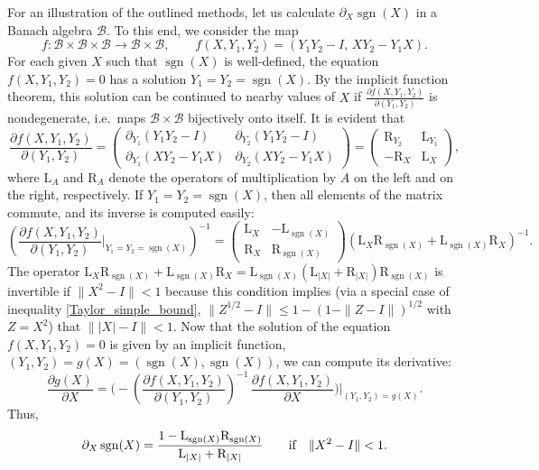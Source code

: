 \documentclass[12pt]{article}
\newcommand{\calB}{\mathcal{B}}
\DeclareMathOperator{\sgn}{sgn}
\newcommand{\La}{\mathrm{L}}
\newcommand{\Ra}{\mathrm{R}}
\renewcommand{\le}{\leqslant}
\newtheorem[definition]{Definition}[Theorem]{Definition}
\newtheorem[remark]{Example}[Theorem]{Example}
\newtheorem[remark]{Remark}[Theorem]{Remark}
\newtheorem[remark]{Question}[Theorem]{Open question}
\newtheorem*[definition]{definition}{Definition}
\newtheorem*[remark]{example}{Example}
\newtheorem*[remark]{remark}{Remark}
\newtheorem*[remark]{question}{Open question}
\numberwithin{equation}{section}
\begin{document}
For an illustration of the outlined methods, let us calculate $\partial_X\sgn(X)$ in a Banach algebra $\calB$. To this end, we consider the map
\begin{equation}
f\colon \calB\times\calB\times\calB\to\calB\times\calB,\qquad
f(X,Y_1,Y_2)=(Y_1Y_2-I,\,XY_2-Y_1X).
\end{equation}
For each given $X$ such that $\sgn(X)$ is well-defined, the equation $f(X,Y_1,Y_2)=0$ has a solution $Y_1=Y_2=\sgn(X)$. By the implicit function theorem, this solution can be continued to nearby values of $X$ if $\frac{\partial f(X,Y_1,Y_2)}{\partial(Y_1,Y_2)}$ is nondegenerate, i.e.\ maps $\calB\times\calB$ bijectively onto itself. It is evident that
\[
\frac{\partial f(X,Y_1,Y_2)}{\partial(Y_1,Y_2)}
=\begin{pmatrix}
\partial_{Y_1}(Y_1Y_2-I) & \partial_{Y_2}(Y_1Y_2-I)\\
\partial_{Y_1}(XY_2-Y_1X) & \partial_{Y_2}(XY_2-Y_1X)
\end{pmatrix}
=\begin{pmatrix}\Ra_{Y_2}&\La_{Y_1}\\ -\Ra_{X}&\La_{X}\end{pmatrix},
\]
where $\La_{A}$ and $\Ra_{A}$ denote the operators of multiplication by $A$ on the left and on the right, respectively. If $Y_1=Y_2=\sgn(X)$, then all elements of the matrix commute, and its inverse is computed easily:
\[
\left(\frac{\partial f(X,Y_1,Y_2)}{\partial(Y_1,Y_2)}
\bigg|_{Y_1=Y_2=\sgn(X)}\right)^{-1}
=\begin{pmatrix}\La_{X}&-\La_{\sgn(X)}\\ \Ra_{X}&\Ra_{\sgn(X)}\end{pmatrix}
(\La_X\Ra_{\sgn(X)}+\La_{\sgn(X)}\Ra_{X})^{-1}.
\]
The operator  $\La_X\Ra_{\sgn(X)}+\La_{\sgn(X)}\Ra_{X} =\La_{\sgn(X)}(\La_{|X|}+\Ra_{|X|})\Ra_{\sgn(X)}$ is invertible if $\|X^2-I\|<1$ because this condition implies (via a special case of inequality \eqref{Taylor_simple_bound}, $\|Z^{1/2}-I\|\le 1-(1-\|Z-I\|)^{1/2}$ with $Z=X^2$) that $\bigl\||X|-I\bigr\|<1$. Now that the solution of the equation $f(X,Y_1,Y_2)=0$ is given by an implicit function, $(Y_1,Y_2)=g(X)=(\sgn(X),\sgn(X))$, we can compute its derivative:
\[
\frac{\partial g(X)}{\partial X}
=\biggl(-\left(\frac{\partial f(X,Y_1,Y_2)}{\partial(Y_1,Y_2)}\right)^{-1}\,
\frac{\partial f(X,Y_1,Y_2)}{\partial X}\biggr)\bigg|_{(Y_1,Y_2)=g(X)}.
\]
Thus,
\begin{equation}
\partial_X\sgn(X)=\frac{1-\La_{\sgn(X)}\Ra_{\sgn(X)}}{\La_{|X|}+\Ra_{|X|}}\qquad
\text{if}\quad \|X^2-I\|<1.
\vspace{8pt}
\end{equation}
\end{document}
